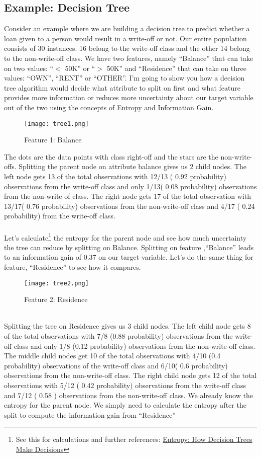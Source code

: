 \subsection{Example: Decision Tree}
    Consider an example where we are building a decision tree to predict whether a loan given to a person would result in a write-off or not. Our entire population consists of 30 instances. 16 belong to the write-off class and the other 14 belong to the non-write-off class. We have two features, namely “Balance” that can take on two values: “$<$ 50K” or “$>$ 50K” and “Residence” that can take on three values: “OWN”, “RENT” or “OTHER”. I’m going to show you how a decision tree algorithm would decide what attribute to split on first and what feature provides more information or reduces more uncertainty about our target variable out of the two using the concepts of Entropy and Information Gain.
    \begin{figure}[h]
        \centering
        \texttt{[image: tree1.png]}
        \caption{Feature 1: Balance}
    \end{figure}
    The dots are the data points with class right-off and the stars are the non-write-offs. Splitting the parent node on attribute balance gives us 2 child nodes. The left node gets 13 of the total observations with 12/13 ( 0.92 probability) observations from the write-off class and only 1/13( 0.08 probability) observations from the non-write of class. The right node gets 17 of the total observation with 13/17( 0.76 probability) observations from the non-write-off class and 4/17 ( 0.24 probability) from the write-off class.
    \\ \\Let’s calculate\footnote[1]{See this for calculations and further references: \href{https://towardsdatascience.com/entropy-how-decision-trees-make-decisions-2946b9c18c8}{Entropy: How Decision Trees Make Decisions}} the entropy for the parent node and see how much uncertainty the tree can reduce by splitting on Balance.    
    Splitting on feature ,“Balance” leads to an information gain of 0.37 on our target variable. Let’s do the same thing for feature, “Residence” to see how it compares.\\ 
    \begin{figure}[h]
        \centering
        \texttt{[image: tree2.png]}
        \caption{Feature 2: Residence}
    \end{figure}
    \\
    Splitting the tree on Residence gives us 3 child nodes. The left child node gets 8 of the total observations with 7/8 (0.88 probability) observations from the write-off class and only 1/8 (0.12 probability) observations from the non-write-off class. The middle child nodes get 10 of the total observations with 4/10 (0.4 probability) observations of the write-off class and 6/10( 0.6 probability) observations from the non-write-off class. The right child node gets 12 of the total observations with 5/12 ( 0.42 probability) observations from the write-off class and 7/12 ( 0.58 ) observations from the non-write-off class. We already know the entropy for the parent node. We simply need to calculate the entropy after the split to compute the information gain from “Residence”

